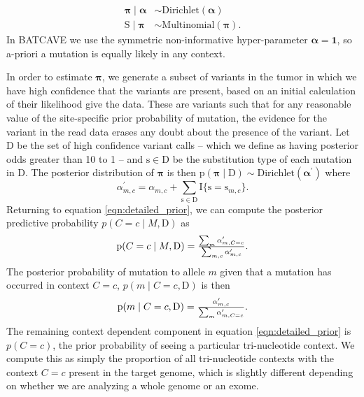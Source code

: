 \documentclass[a4,center,fleqn]{NAR}
\newcommand{\batcave}{BATCAVE }
\begin{document}
$$
\begin{aligned}
  \boldsymbol{\pi} \mid \boldsymbol{\alpha} &\sim \textrm{Dirichlet}(\boldsymbol{\alpha}) \\
  \mathrm{S} \mid \boldsymbol{\pi} & \sim \textrm{Multinomial}(\boldsymbol{\pi}).
\end{aligned}
$$
In \batcave we use the symmetric non-informative hyper-parameter $\boldsymbol{\alpha} = \boldsymbol{1}$, so a-priori a mutation is equally likely in any context.

In order to estimate $\boldsymbol{\pi}$, we generate a subset of variants in the tumor in which we have high confidence that the variants are present, based on an initial calculation of their likelihood give the data.
These are variants such that for any reasonable value of the site-specific prior probability of mutation, the evidence for the variant in the read data erases any doubt about the presence of the variant. 
Let $\mathrm{D}$ be the set of high confidence variant calls -- which we define as having posterior odds greater than 10 to 1 -- and $\mathrm{s} \in \mathrm{D}$ be the substitution type of each mutation in $\mathrm{D}$.
The posterior distribution of $\boldsymbol{\pi}$ is then $\mathrm{p}(\boldsymbol{\pi} \mid \mathrm{D}) \sim \textrm{Dirichlet}(\boldsymbol{\alpha^{\prime}})$ where
  $$
    \alpha^{\prime}_{m,c} = \alpha_{m,c} + \sum\limits_{\mathrm{s} \in \mathrm{D}} \mathrm{I}\{\mathrm{s} = \mathrm{s}_{m,c}\}.
  $$
Returning to equation \ref{eqn:detailed_prior}, we can compute the posterior predictive probability $p(C = c \mid M,\mathrm{D})$ as
\begin{equation}
  \label{eqn:post_pred}
  $$
  \mathrm{p}(C = c \mid M,\mathrm{D}) = \frac{\sum_{m}\alpha^{\prime}_{m,C = c}}{\sum_{m,c}\alpha^{\prime}_{m,c}}.
  $$
\end{equation}
The posterior probability of mutation to allele $m$ given that a mutation has occurred in context $C = c$, $p(m  \mid C = c,\mathrm{D})$ is then
\begin{equation}
  \label{eqn:to_allele}
  $$
   \mathrm{p}(m \mid C = c,\mathrm{D}) = \frac{\alpha^{\prime}_{m,c}}{\sum_{m} \alpha^{\prime}_{m,C = c}}.
  $$
\end{equation}
The remaining context dependent component in equation \ref{eqn:detailed_prior} is $p(C = c)$, the prior probability of seeing a particular tri-nucleotide context.
We compute this as simply the proportion of all tri-nucleotide contexts with the context $C = c$ present in the target genome, which is slightly different depending on whether we are analyzing a whole genome or an exome.
\end{document}
